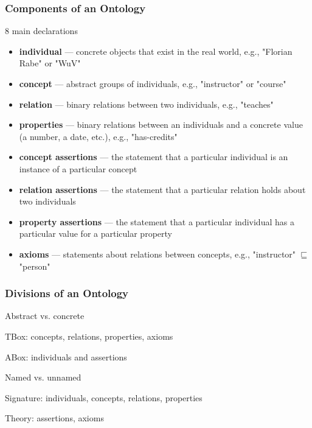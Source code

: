 \begin{frame}\frametitle{Components of an Ontology}
8 main declarations
\begin{itemize}
 \item \textbf{individual} --- concrete objects that exist in the real world, e.g., "Florian Rabe" or "WuV"
 \item \textbf{concept} --- abstract groups of individuals, e.g., "instructor" or "course"
 \item \textbf{relation} --- binary relations between two individuals, e.g., "teaches"
 \item \textbf{properties} --- binary relations between an individuals and a concrete value (a number, a date, etc.), e.g., "has-credits"
 \item \textbf{concept assertions} --- the statement that a particular individual is an instance of a particular concept
 \item \textbf{relation assertions} --- the statement that a particular relation holds about two individuals
 \item \textbf{property assertions} --- the statement that a particular individual has a particular value for a particular property
 \item \textbf{axioms} --- statements about relations between concepts, e.g., "instructor" $\sqsubseteq$ "person"
\end{itemize}
\end{frame}

\begin{frame}\frametitle{Divisions of an Ontology}
\begin{blockitems}{Abstract vs. concrete}
 \item TBox: concepts, relations, properties, axioms
 \item ABox: individuals and assertions
\end{blockitems}

\begin{blockitems}{Named vs. unnamed}
 \item Signature: individuals, concepts, relations, properties 
 \item Theory: assertions, axioms
\end{blockitems}
\end{frame}

